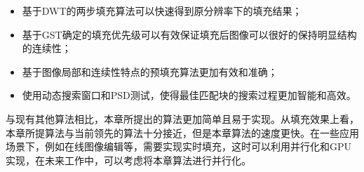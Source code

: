 \begin{itemize}
 \item 基于DWT的两步填充算法可以快速得到原分辨率下的填充结果；
 \item 基于GST确定的填充优先级可以有效保证填充后图像可以很好的保持明显结构的连续性；
\item 基于图像局部和连续性特点的预填充算法更加有效和准确；
\item 使用动态搜索窗口和PSD测试，使得最佳匹配块的搜索过程更加智能和高效。
 \end{itemize}
\par
与现有其他算法相比，本章所提出的算法更加简单且易于实现。从填充效果上看，本章所提算法与当前领先的算法\cite{LeMeur:2012,Xu:2010}十分接近，但是本章算法的速度更快。在一些应用场景下，例如在线图像编辑等，需要实现实时填充，这时可以利用并行化和GPU实现\cite{kwokFast}，在未来工作中，可以考虑将本章算法进行并行化。